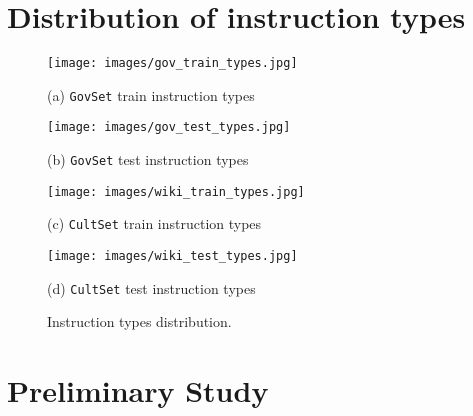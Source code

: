 \section{Distribution of instruction types}

\begin{figure*}[ht]
    \centering
    \begin{minipage}[b]{0.45\textwidth}
        \centering
        \texttt{[image: images/gov\_train\_types.jpg]}
        \caption*{  (a) \texttt{GovSet}  train instruction types}
        \texttt{[image: images/gov\_test\_types.jpg]}
        \caption*{  (b) \texttt{GovSet} test  instruction types}
    \end{minipage}
    \hfill
    \begin{minipage}[b]{0.45\textwidth}
        \centering
       \texttt{[image: images/wiki\_train\_types.jpg]}
        \caption*{  (c) \texttt{CultSet} train instruction types}
        \texttt{[image: images/wiki\_test\_types.jpg]}
        \caption*{  (d) \texttt{CultSet} test instruction types}
    \end{minipage}
    \caption{Instruction types distribution.}
    \label{fig:task_types}
\end{figure*}



\clearpage
\section{Preliminary Study}
\label{sec:prelimanary}
\FloatBarrier

\clearpage
